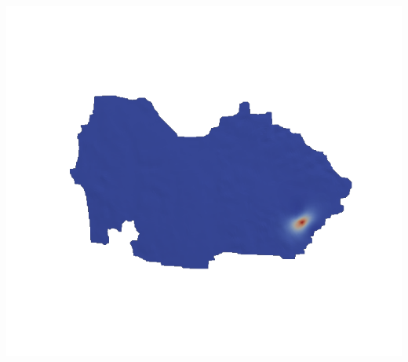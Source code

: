 \documentclass[10pt,final,xcolor=dvipsnames]{beamer}
\begin{document}
\begin{frame}
{\begin{center}
		\includegraphics[width=1.0\columnwidth]{reordered_phi/phi68_minimal.png}
	\end{center}
}

\end{frame}
\end{document}
